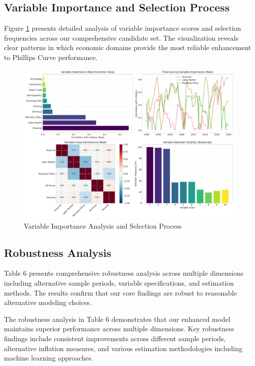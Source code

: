 \documentclass[12pt]{article}
\begin{document}
\subsection{Variable Importance and Selection Process}

Figure \ref{fig:variable_selection} presents detailed analysis of variable importance scores and selection frequencies across our comprehensive candidate set. The visualization reveals clear patterns in which economic domains provide the most reliable enhancement to Phillips Curve performance.

\begin{figure}[H]
\centering
\includegraphics[width=\textwidth]{figures/variable_selection.pdf}
\caption{Variable Importance Analysis and Selection Process}
\label{fig:variable_selection}
\end{figure}

\subsection{Robustness Analysis}

Table 6 presents comprehensive robustness analysis across multiple dimensions including alternative sample periods, variable specifications, and estimation methods. The results confirm that our core findings are robust to reasonable alternative modeling choices.


The robustness analysis in Table 6 demonstrates that our enhanced model maintains superior performance across multiple dimensions. Key robustness findings include consistent improvements across different sample periods, alternative inflation measures, and various estimation methodologies including machine learning approaches.
\end{document}

